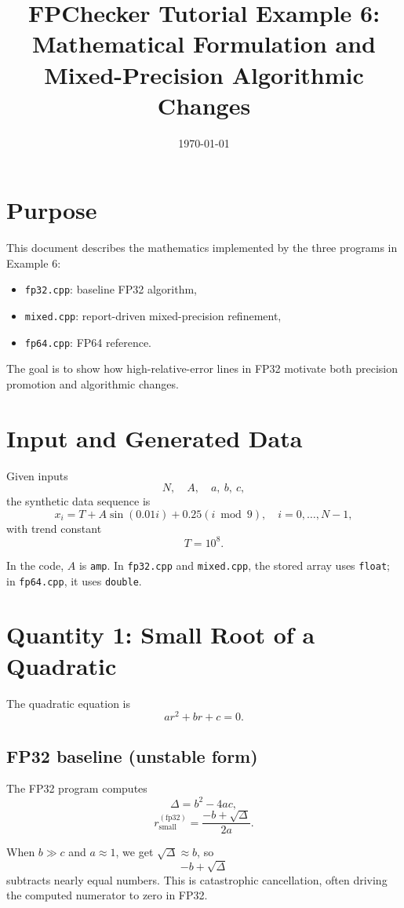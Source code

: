 \documentclass[11pt]{article}
\title{FPChecker Tutorial Example 6: Mathematical Formulation and Mixed-Precision Algorithmic Changes}
\author{}
\date{\today}
\begin{document}
\maketitle

\section{Purpose}
This document describes the mathematics implemented by the three programs in Example 6:
\begin{itemize}
  \item \texttt{fp32.cpp}: baseline FP32 algorithm,
  \item \texttt{mixed.cpp}: report-driven mixed-precision refinement,
  \item \texttt{fp64.cpp}: FP64 reference.
\end{itemize}

The goal is to show how high-relative-error lines in FP32 motivate both precision promotion and algorithmic changes.

\section{Input and Generated Data}
Given inputs
\[
N,\quad A,\quad a,\ b,\ c,
\]
the synthetic data sequence is
\[
x_i = T + A\sin(0.01 i) + 0.25(i \bmod 9), \quad i=0,\dots,N-1,
\]
with trend constant
\[
T = 10^8.
\]

In the code, \(A\) is \texttt{amp}. In \texttt{fp32.cpp} and \texttt{mixed.cpp}, the stored array uses \texttt{float}; in \texttt{fp64.cpp}, it uses \texttt{double}.

\section{Quantity 1: Small Root of a Quadratic}
The quadratic equation is
\[
a r^2 + b r + c = 0.
\]

\subsection{FP32 baseline (unstable form)}
The FP32 program computes
\[
\Delta = b^2 - 4ac,
\]
\[
r_{\text{small}}^{(\mathrm{fp32})} = \frac{-b + \sqrt{\Delta}}{2a}.
\]

When \(b \gg c\) and \(a\approx 1\), we get \(\sqrt{\Delta} \approx b\), so
\[
-b + \sqrt{\Delta}
\]
subtracts nearly equal numbers. This is catastrophic cancellation, often driving the computed numerator to zero in FP32.
\end{document}
